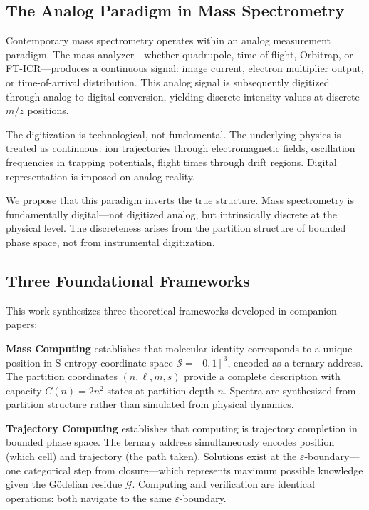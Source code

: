 \documentclass[twocolumn,10pt]{article}
\newcommand{\eps}{\varepsilon}
\newcommand{\Gres}{\mathcal{G}}
\begin{document}
\subsection{The Analog Paradigm in Mass Spectrometry}

Contemporary mass spectrometry operates within an analog measurement paradigm. The mass analyzer---whether quadrupole, time-of-flight, Orbitrap, or FT-ICR---produces a continuous signal: image current, electron multiplier output, or time-of-arrival distribution. This analog signal is subsequently digitized through analog-to-digital conversion, yielding discrete intensity values at discrete $m/z$ positions.

The digitization is technological, not fundamental. The underlying physics is treated as continuous: ion trajectories through electromagnetic fields, oscillation frequencies in trapping potentials, flight times through drift regions. Digital representation is imposed on analog reality.

We propose that this paradigm inverts the true structure. Mass spectrometry is fundamentally digital---not digitized analog, but intrinsically discrete at the physical level. The discreteness arises from the partition structure of bounded phase space, not from instrumental digitization.

\subsection{Three Foundational Frameworks}

This work synthesizes three theoretical frameworks developed in companion papers:

\textbf{Mass Computing} \cite{masscomputing2026} establishes that molecular identity corresponds to a unique position in S-entropy coordinate space $\mathcal{S} = [0,1]^3$, encoded as a ternary address. The partition coordinates $(n, \ell, m, s)$ provide a complete description with capacity $C(n) = 2n^2$ states at partition depth $n$. Spectra are synthesized from partition structure rather than simulated from physical dynamics.

\textbf{Trajectory Computing} \cite{trajectorycomputing2026} establishes that computing is trajectory completion in bounded phase space. The ternary address simultaneously encodes position (which cell) and trajectory (the path taken). Solutions exist at the $\eps$-boundary---one categorical step from closure---which represents maximum possible knowledge given the G\"odelian residue $\Gres$. Computing and verification are identical operations: both navigate to the same $\eps$-boundary.
\end{document}
